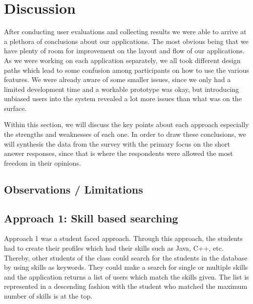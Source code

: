 \documentclass[conference]{IEEEtran}
\begin{document}
\section{Discussion}
After conducting user evaluations and collecting results we were able to arrive at a plethora of conclusions about our applications. The most obvious being that we have plenty of room for improvement on the layout and flow of our applications. As we were working on each application separately, we all took different design paths which lead to some confusion among participants on how to use the various features. We were already aware of some smaller issues, since we only had a limited development time and a workable prototype was okay, but introducing unbiased users into the system revealed a lot more issues than what was on the surface. 

Within this section, we will discuss the key points about each approach especially the strengths and weaknesses of each one. In order to draw these conclusions, we will synthesis the data from the survey with the primary focus on the short answer responses, since that is where the respondents were allowed the most freedom in their opinions. 

\subsection{Observations / Limitations}

\subsection{Approach 1: Skill based searching}
Approach 1 was a student faced approach. Through this approach, the students had to create their profiles which had their skills such as Java, C++, etc. Thereby, other students of the class could search for the students in the database by using skills as keywords. They could make a search for single or multiple skills and the application returns a list of users which match the skills given. The list is represented in a descending fashion with the student who matched the maximum number of skills is at the top.
\end{document}
